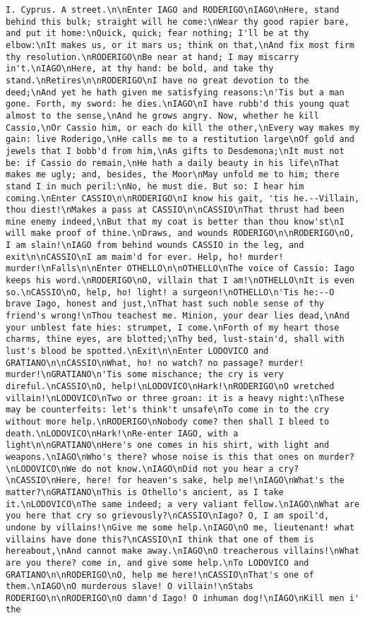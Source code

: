 \begin{verbatim}
I. Cyprus. A street.\n\nEnter IAGO and RODERIGO\nIAGO\nHere, stand behind this bulk; straight will he come:\nWear thy good rapier bare, and put it home:\nQuick, quick; fear nothing; I'll be at thy elbow:\nIt makes us, or it mars us; think on that,\nAnd fix most firm thy resolution.\nRODERIGO\nBe near at hand; I may miscarry in't.\nIAGO\nHere, at thy hand: be bold, and take thy stand.\nRetires\n\nRODERIGO\nI have no great devotion to the deed;\nAnd yet he hath given me satisfying reasons:\n'Tis but a man gone. Forth, my sword: he dies.\nIAGO\nI have rubb'd this young quat almost to the sense,\nAnd he grows angry. Now, whether he kill Cassio,\nOr Cassio him, or each do kill the other,\nEvery way makes my gain: live Roderigo,\nHe calls me to a restitution large\nOf gold and jewels that I bobb'd from him,\nAs gifts to Desdemona;\nIt must not be: if Cassio do remain,\nHe hath a daily beauty in his life\nThat makes me ugly; and, besides, the Moor\nMay unfold me to him; there stand I in much peril:\nNo, he must die. But so: I hear him coming.\nEnter CASSIO\n\nRODERIGO\nI know his gait, 'tis he.--Villain, thou diest!\nMakes a pass at CASSIO\n\nCASSIO\nThat thrust had been mine enemy indeed,\nBut that my coat is better than thou know'st\nI will make proof of thine.\nDraws, and wounds RODERIGO\n\nRODERIGO\nO, I am slain!\nIAGO from behind wounds CASSIO in the leg, and exit\n\nCASSIO\nI am maim'd for ever. Help, ho! murder! murder!\nFalls\n\nEnter OTHELLO\n\nOTHELLO\nThe voice of Cassio: Iago keeps his word.\nRODERIGO\nO, villain that I am!\nOTHELLO\nIt is even so.\nCASSIO\nO, help, ho! light! a surgeon!\nOTHELLO\n'Tis he:--O brave Iago, honest and just,\nThat hast such noble sense of thy friend's wrong!\nThou teachest me. Minion, your dear lies dead,\nAnd your unblest fate hies: strumpet, I come.\nForth of my heart those charms, thine eyes, are blotted;\nThy bed, lust-stain'd, shall with lust's blood be spotted.\nExit\n\nEnter LODOVICO and GRATIANO\n\nCASSIO\nWhat, ho! no watch? no passage? murder! murder!\nGRATIANO\n'Tis some mischance; the cry is very direful.\nCASSIO\nO, help!\nLODOVICO\nHark!\nRODERIGO\nO wretched villain!\nLODOVICO\nTwo or three groan: it is a heavy night:\nThese may be counterfeits: let's think't unsafe\nTo come in to the cry without more help.\nRODERIGO\nNobody come? then shall I bleed to death.\nLODOVICO\nHark!\nRe-enter IAGO, with a light\n\nGRATIANO\nHere's one comes in his shirt, with light and weapons.\nIAGO\nWho's there? whose noise is this that ones on murder?\nLODOVICO\nWe do not know.\nIAGO\nDid not you hear a cry?\nCASSIO\nHere, here! for heaven's sake, help me!\nIAGO\nWhat's the matter?\nGRATIANO\nThis is Othello's ancient, as I take it.\nLODOVICO\nThe same indeed; a very valiant fellow.\nIAGO\nWhat are you here that cry so grievously?\nCASSIO\nIago? O, I am spoil'd, undone by villains!\nGive me some help.\nIAGO\nO me, lieutenant! what villains have done this?\nCASSIO\nI think that one of them is hereabout,\nAnd cannot make away.\nIAGO\nO treacherous villains!\nWhat are you there? come in, and give some help.\nTo LODOVICO and GRATIANO\n\nRODERIGO\nO, help me here!\nCASSIO\nThat's one of them.\nIAGO\nO murderous slave! O villain!\nStabs RODERIGO\n\nRODERIGO\nO damn'd Iago! O inhuman dog!\nIAGO\nKill men i' the 
\end{verbatim}
